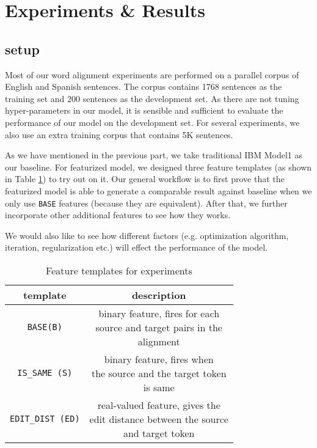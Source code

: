 \documentclass[11pt,letterpaper]{article}
\begin{document}
\section{Experiments \& Results}
\subsection{setup}
Most of our word alignment experiments are performed on a parallel corpus of English and Spanish sentences.
The corpus contains 1768 sentences as the training set and 200 sentences as the development set.
As there are not tuning hyper-parameters in our model, it is sensible and sufficient to evaluate the performance of our model on the development set.
For several experiments, we also use an extra training corpus that contains 5K %
sentences.

As we have mentioned in the previous part, we take traditional IBM Model1 as our baseline.
For featurized model, we designed three feature templates (as shown in Table \ref{featureset-table}) to try out on it.
Our general workflow is to first prove that the featurized model is able to generate a comparable result against baseline when we only use \texttt{BASE} features (because they are equivalent).
After that, we further incorporate other additional features to see how they works.

We would also like to see how different factors (e.g. optimization algorithm, iteration, regularization etc.) will effect the performance of the model.

\begin{table}[h]
\begin{center}
\begin{tabular}{|c|c|}
\hline 
\bf template & \bf description \\
\hline
\texttt{BASE(B)} & \makecell[l]{binary feature, fires for each\\ source and target pairs in the\\ alignment} \\
\texttt{IS\_SAME (S)} & \makecell[l]{binary feature, fires when\\ the source and the target token\\ is same}\\
\texttt{EDIT\_DIST (ED)} & \makecell[l]{real-valued feature, gives the\\ edit distance between the source\\ and target token}\\
\hline
\end{tabular}
\end{center}
\caption{\label{featureset-table} Feature templates for experiments}
\end{table}
\end{document}
